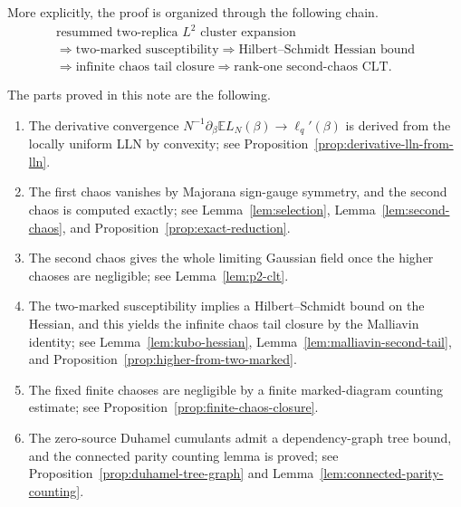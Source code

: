 \documentclass[11pt]{article}
\newcommand{\E}{\mathbb{E}}
\begin{document}
More explicitly, the proof is organized through the following chain.
\begin{equation}\label{eq:reader-chain}
  \begin{gathered}
    \text{resummed two-replica }L^2\text{ cluster expansion}
    \\
    \Longrightarrow
    \text{two-marked susceptibility}
    \Longrightarrow
    \text{Hilbert--Schmidt Hessian bound}
    \\
    \Longrightarrow
    \text{infinite chaos tail closure}
    \Longrightarrow
    \text{rank-one second-chaos CLT}.
  \end{gathered}
\end{equation}

The parts proved in this note are the following.
\begin{enumerate}[label=\textup{(\roman*)},leftmargin=*]
  \item The derivative convergence
  $N^{-1}\partial_\beta\E L_N(\beta)\to\ell_q'(\beta)$ is derived from the
  locally uniform LLN by convexity; see Proposition~\ref{prop:derivative-lln-from-lln}.

  \item The first chaos vanishes by Majorana sign-gauge symmetry, and the second
  chaos is computed exactly; see Lemma~\ref{lem:selection},
  Lemma~\ref{lem:second-chaos}, and Proposition~\ref{prop:exact-reduction}.

  \item The second chaos gives the whole limiting Gaussian field once the higher
  chaoses are negligible; see Lemma~\ref{lem:p2-clt}.

  \item The two-marked susceptibility implies a Hilbert--Schmidt bound on the
  Hessian, and this yields the infinite chaos tail closure by the Malliavin
  identity; see Lemma~\ref{lem:kubo-hessian},
  Lemma~\ref{lem:malliavin-second-tail}, and
  Proposition~\ref{prop:higher-from-two-marked}.

  \item The fixed finite chaoses are negligible by a finite marked-diagram
  counting estimate; see Proposition~\ref{prop:finite-chaos-closure}.

  \item The zero-source Duhamel cumulants admit a dependency-graph tree bound,
  and the connected parity counting lemma is proved; see
  Proposition~\ref{prop:duhamel-tree-graph} and
  Lemma~\ref{lem:connected-parity-counting}.
\end{enumerate}
\end{document}
